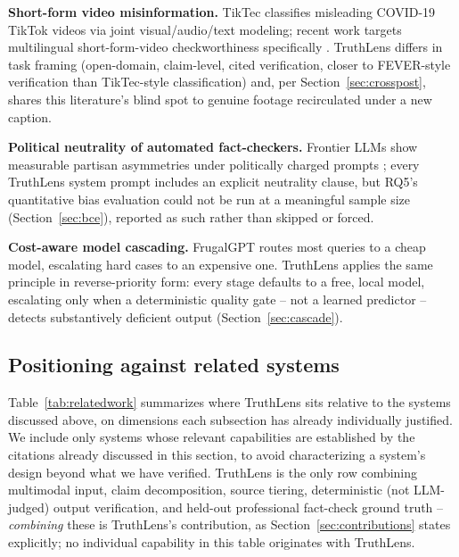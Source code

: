 \documentclass[conference]{IEEEtran}
\begin{document}
\textbf{Short-form video misinformation.} TikTec \cite{shang2021tiktec}
classifies misleading COVID-19 TikTok videos via joint visual/audio/text
modeling; recent work targets multilingual short-form-video checkworthiness
specifically \cite{vatndal2025shortcheck}. TruthLens differs in task
framing (open-domain, claim-level, cited verification, closer to
FEVER-style verification than TikTec-style classification) and, per
Section~\ref{sec:crosspost}, shares this literature's blind spot to
genuine footage recirculated under a new caption.

\textbf{Political neutrality of automated fact-checkers.} Frontier LLMs
show measurable partisan asymmetries under politically charged prompts
\cite{peng2026partisan}; every TruthLens system prompt includes an
explicit neutrality clause, but RQ5's quantitative bias evaluation could
not be run at a meaningful sample size (Section~\ref{sec:bce}), reported
as such rather than skipped or forced.

\textbf{Cost-aware model cascading.} FrugalGPT \cite{chen2023frugalgpt}
routes most queries to a cheap model, escalating hard cases to an
expensive one. TruthLens applies the same principle in reverse-priority
form: every stage defaults to a free, local model, escalating only when a
deterministic quality gate -- not a learned predictor -- detects
substantively deficient output (Section~\ref{sec:cascade}).

\subsection{Positioning against related systems}
\label{sec:positioning}
Table~\ref{tab:relatedwork} summarizes where TruthLens sits relative to
the systems discussed above, on dimensions each subsection has already
individually justified. We include only systems whose relevant
capabilities are established by the citations already discussed in this
section, to avoid characterizing a system's design beyond what we have
verified. TruthLens is the only row combining multimodal input, claim
decomposition, source tiering, deterministic (not LLM-judged) output
verification, and held-out professional fact-check ground truth --
\emph{combining} these is TruthLens's contribution, as
Section~\ref{sec:contributions} states explicitly; no individual
capability in this table originates with TruthLens.
\end{document}
